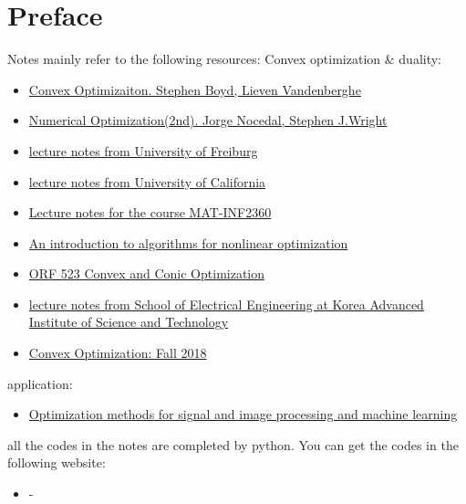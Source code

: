 \chapter*{Preface}


Notes mainly refer to the following resources:
Convex optimization & duality:
\begin{itemize}
    \item \href{https://web.stanford.edu/~boyd/cvxbook/}{Convex Optimizaiton. Stephen Boyd, Lieven Vandenberghe}
    \item \href{https://link.springer.com/book/10.1007/978-0-387-40065-5}{Numerical Optimization(2nd). Jorge Nocedal, Stephen J.Wright} 
    \item \href{https://cdn.syscop.de/publications/Diehl2016.pdf}{lecture notes from University of Freiburg}
    \item \href{https://faculty.ucmerced.edu/mcarreira-perpinan/teaching/EECS260/lecture-notes.pdf}{lecture notes from University of California}
    \item \href{https://www.uio.no/studier/emner/matnat/math/nedlagte-emner/MAT-INF2360/v13/matinf2360part3.pdf}{Lecture notes for the course MAT-INF2360}
    \item \href{https://www.numerical.rl.ac.uk/people/nimg/msc/lectures/paper.pdf}{An introduction to algorithms for nonlinear optimization} 
    \item \href{https://www.princeton.edu/~aaa/Public/Teaching/ORF523/S16/}{ORF 523 Convex and Conic Optimization}
    \item \href{}{lecture notes from School of Electrical Engineering at Korea Advanced Institute of Science and Technology}
    \item \href{https://www.stat.cmu.edu/~ryantibs/convexopt-F18/}{Convex Optimization: Fall 2018}
\end{itemize}


application:

\begin{itemize}
    \item \href{https://web.eecs.umich.edu/~fessler/course/598/}{Optimization methods for signal and image processing and machine learning}
\end{itemize}




all the codes in the notes are completed by python. You can get the codes in the following website:
\begin{itemize}
    \item -
\end{itemize}

